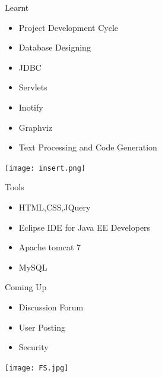 \documentclass[14pt]{beamer}
\begin{document}
\begin{frame}{Learnt}

	\begin{itemize}

		\item Project Development Cycle

		\item Database Designing

		\item JDBC

		\item Servlets

		\item Inotify

		\item Graphviz

		\item Text Processing and Code Generation

	\end{itemize}

	\begin{center}

		\texttt{[image: insert.png]}

	\end{center}

\end{frame}


\begin{frame}{Tools}

	\begin{itemize}

		\item HTML,CSS,JQuery

		\item Eclipse IDE for Java EE Developers

		\item Apache tomcat 7

		\item MySQL

	\end{itemize}

\end{frame}


\begin{frame}{Coming Up}

	\begin{itemize}

		\item Discussion Forum

		\item User Posting
		
		\item Security

	\end{itemize}

	\begin{center}

		\texttt{[image: FS.jpg]}	

	\end{center}

\end{frame}
\end{document}
